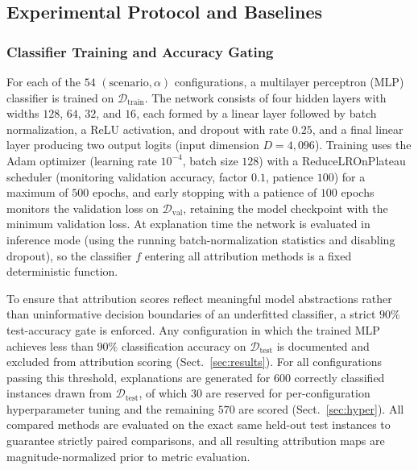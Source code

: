 \documentclass[pdflatex,sn-mathphys-num]{sn-jnl}
\theoremstyle{thmstyleone}
\theoremstyle{thmstyletwo}%
\theoremstyle{thmstylethree}%
\begin{document}
\subsection{Experimental Protocol and Baselines}\label{sec:param_config}

\subsubsection{Classifier Training and Accuracy Gating}\label{sec:protocol_training}
For each of the $54$ $(\text{scenario}, \alpha)$ configurations, a multilayer perceptron (MLP) classifier is trained on $\mathcal{D}_{\text{train}}$. The network consists of four hidden layers with widths $128$, $64$, $32$, and $16$, each formed by a linear layer followed by batch normalization, a ReLU activation, and dropout with rate $0.25$, and a final linear layer producing two output logits (input dimension $D = 4{,}096$). Training uses the Adam optimizer (learning rate $10^{-4}$, batch size $128$) with a ReduceLROnPlateau scheduler (monitoring validation accuracy, factor $0.1$, patience $100$) for a maximum of $500$ epochs, and early stopping with a patience of $100$ epochs monitors the validation loss on $\mathcal{D}_{\text{val}}$, retaining the model checkpoint with the minimum validation loss. At explanation time the network is evaluated in inference mode (using the running batch-normalization statistics and disabling dropout), so the classifier $f$ entering all attribution methods is a fixed deterministic function.

To ensure that attribution scores reflect meaningful model abstractions rather than uninformative decision boundaries of an underfitted classifier, a strict $90\%$ test-accuracy gate is enforced. Any configuration in which the trained MLP achieves less than $90\%$ classification accuracy on $\mathcal{D}_{\text{test}}$ is documented and excluded from attribution scoring (Sect.~\ref{sec:results}). For all configurations passing this threshold, explanations are generated for $600$ correctly classified instances drawn from $\mathcal{D}_{\text{test}}$, of which $30$ are reserved for per-configuration hyperparameter tuning and the remaining $570$ are scored (Sect.~\ref{sec:hyper}). All compared methods are evaluated on the exact same held-out test instances to guarantee strictly paired comparisons, and all resulting attribution maps are magnitude-normalized prior to metric evaluation.
\end{document}
